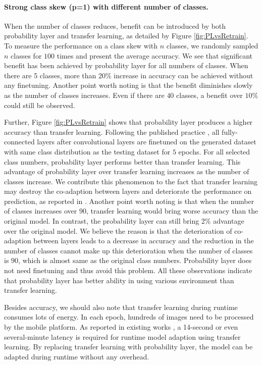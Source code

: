 \documentclass[pageno]{jpaper}
\begin{document}
\paragraph{Strong class skew (p=1) with different number of classes.}

When the number of classes reduces, benefit can be introduced by both probability layer and transfer learning, as detailed by Figure \ref{fig:PLvsRetrain}. To measure the performance on a class skew with $n$ classes, we randomly sampled $n$ classes for $100$ times and present the average accuracy. We see that significant benefit has been achieved by probability layer for all numbers of classes. When there are 5 classes, more than 20\% increase in accuracy can be achieved without any finetuning. Another point worth noting is that the benefit diminishes slowly as the number of classes increases. Even if there are $40$ classes, a benefit over $10\%$ could still be observed.

Further, Figure \ref{fig:PLvsRetrain} shows that probability layer produces a higher accuracy than transfer learning. Following the published practice \cite{doersch2015unsupervised, han2016mcdnn, oquab2014learning, shen2016fast, yosinski2014transferable}, all fully-connected layers after convolutional layers are finetuned on the generated dataset with same class distribution as the testing dataset for $5$ epochs. For all selected class numbers, probability layer performs better than transfer learning. This advantage of probability layer over transfer learning increases as the number of classes increase. We contribute this phenomenon to the fact that transfer learning may destroy the co-adaption between layers and deteriorate the performance on prediction, as reported in \cite{yosinski2014transferable}. Another point worth noting is that when the number of classes increases over $90$, transfer learning would bring worse accuracy than the original model. In contrast, the probability layer can still bring 2\% advantage over the original model. We believe the reason is that the deterioration of co-adaption between layers leads to a decrease in accuracy and the reduction in the number of classes cannot make up this deterioration when the number of classes is $90$, which is almost same as the original class numbers. Probability layer does not need finetuning and thus avoid this problem. All these observations indicate that probability layer has better ability in using various environment than transfer learning.

Besides accuracy, we should also note that transfer learning during runtime consumes lots of energy.  In each epoch, hundreds of images need to be processed by the mobile platform. As reported in existing works \cite{shen2016fast, han2016mcdnn}, a 14-second or even several-minute latency is required for runtime model adaption using transfer learning. By replacing transfer learning with probability layer, the model can be adapted during runtime without any overhead. 
\end{document}

